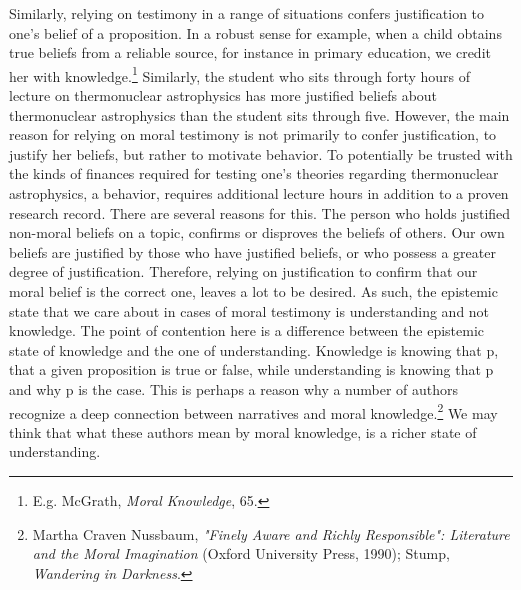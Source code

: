 \documentclass[phdthesis,12pt,final]{wuthesis}
\theoremstyle{definition}
\theoremstyle{definition}
\theoremstyle{definition}
\theoremstyle{definition}
\theoremstyle{remark}
\begin{document}
Similarly, relying on testimony in a range of situations confers justification to one's belief of a proposition. In a robust sense for example, when a child obtains true beliefs from a reliable source, for instance in primary education, we credit her with knowledge.\footnote{E.g. McGrath, \emph{Moral {Knowledge}}, 65.} Similarly, the student who sits through forty hours of lecture on thermonuclear astrophysics has more justified beliefs about thermonuclear astrophysics than the student sits through five. However, the main reason for relying on moral testimony is not primarily to confer justification, to justify her beliefs, but rather to motivate behavior. To potentially be trusted with the kinds of finances required for testing one's theories regarding thermonuclear astrophysics, a behavior, requires additional lecture hours in addition to a proven research record. There are several reasons for this. The person who holds justified non-moral beliefs on a topic, confirms or disproves the beliefs of others. Our own beliefs are justified by those who have justified beliefs, or who possess a greater degree of justification. Therefore, relying on justification to confirm that our moral belief is the correct one, leaves a lot to be desired. As such, the epistemic state that we care about in cases of moral testimony is understanding and not knowledge. The point of contention here is a difference between the epistemic state of knowledge and the one of understanding. Knowledge is knowing that p, that a given proposition is true or false, while understanding is knowing that p and why p is the case. This is perhaps a reason why a number of authors recognize a deep connection between narratives and moral knowledge.\footnote{Martha Craven Nussbaum, \emph{"{Finely Aware} and {Richly Responsible}": {Literature} and the {Moral Imagination}} (Oxford University Press, 1990); Stump, \emph{Wandering in {Darkness}}.} We may think that what these authors mean by moral knowledge, is a richer state of understanding.
\end{document}
